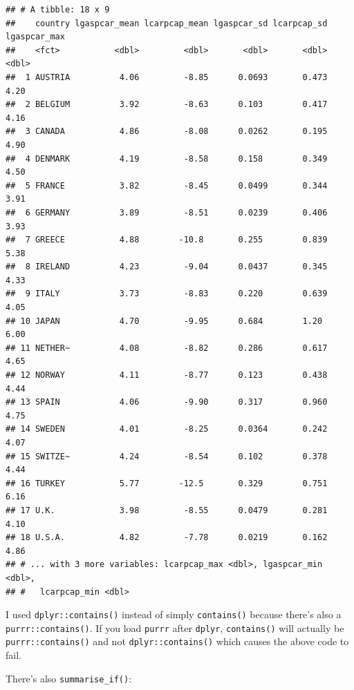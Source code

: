 \documentclass[]{gitbook}
\newenvironment{Shaded}{\begin{snugshade}}{\end{snugshade}}
\newcommand{\KeywordTok}[1]{\textcolor[rgb]{0.13,0.29,0.53}{\textbf{#1}}}
\newcommand{\NormalTok}[1]{#1}
\newcommand{\OperatorTok}[1]{\textcolor[rgb]{0.81,0.36,0.00}{\textbf{#1}}}
\newcommand{\StringTok}[1]{\textcolor[rgb]{0.31,0.60,0.02}{#1}}
\begin{document}
\begin{verbatim}
## # A tibble: 18 x 9
##    country lgaspcar_mean lcarpcap_mean lgaspcar_sd lcarpcap_sd lgaspcar_max
##    <fct>           <dbl>         <dbl>       <dbl>       <dbl>        <dbl>
##  1 AUSTRIA          4.06         -8.85      0.0693       0.473         4.20
##  2 BELGIUM          3.92         -8.63      0.103        0.417         4.16
##  3 CANADA           4.86         -8.08      0.0262       0.195         4.90
##  4 DENMARK          4.19         -8.58      0.158        0.349         4.50
##  5 FRANCE           3.82         -8.45      0.0499       0.344         3.91
##  6 GERMANY          3.89         -8.51      0.0239       0.406         3.93
##  7 GREECE           4.88        -10.8       0.255        0.839         5.38
##  8 IRELAND          4.23         -9.04      0.0437       0.345         4.33
##  9 ITALY            3.73         -8.83      0.220        0.639         4.05
## 10 JAPAN            4.70         -9.95      0.684        1.20          6.00
## 11 NETHER~          4.08         -8.82      0.286        0.617         4.65
## 12 NORWAY           4.11         -8.77      0.123        0.438         4.44
## 13 SPAIN            4.06         -9.90      0.317        0.960         4.75
## 14 SWEDEN           4.01         -8.25      0.0364       0.242         4.07
## 15 SWITZE~          4.24         -8.54      0.102        0.378         4.44
## 16 TURKEY           5.77        -12.5       0.329        0.751         6.16
## 17 U.K.             3.98         -8.55      0.0479       0.281         4.10
## 18 U.S.A.           4.82         -7.78      0.0219       0.162         4.86
## # ... with 3 more variables: lcarpcap_max <dbl>, lgaspcar_min <dbl>,
## #   lcarpcap_min <dbl>
\end{verbatim}

I used \texttt{dplyr::contains()} instead of simply \texttt{contains()} because there's also a
\texttt{purrr::contains()}. If you load \texttt{purrr} after \texttt{dplyr}, \texttt{contains()} will actually be
\texttt{purrr::contains()} and not \texttt{dplyr::contains()} which causes the above code to fail.

There's also \texttt{summarise\_if()}:

\begin{Shaded}
\end{Shaded}
\end{document}
